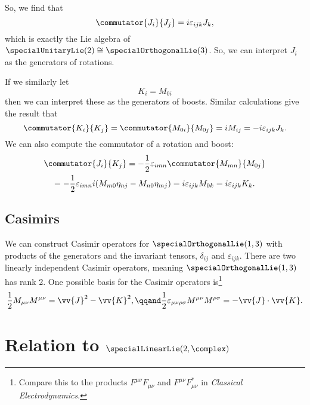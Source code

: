 \documentclass[fleqn]{NotesClass}
\newcommand{\course}[1]{\textit{#1}}
\newcommand{\minkowskiMetric}{\eta}
\newcommand{\isomorphic}{\cong}
\begin{document}
    So, we find that
    \begin{equation}
        \commutator{J_i}{J_j} = i\varepsilon_{ijk}J_k,
    \end{equation}
    which is exactly the Lie algebra of \(\specialUnitaryLie(2) \isomorphic \specialOrthogonalLie(3)\).
    So, we can interpret \(J_i\) as the generators of rotations.
    
    If we similarly let
    \begin{equation}
        K_i = M_{0i}
    \end{equation}
    then we can interpret these as the generators of boosts.
    Similar calculations give the result that
    \begin{equation}
        \commutator{K_i}{K_j} = \commutator{M_{0i}}{M_{0j}} = iM_{ij} = -i\varepsilon_{ijk}J_k.
    \end{equation}
    We can also compute the commutator of a rotation and boost:
    \begin{multline}
        \commutator{J_i}{K_j} = -\frac{1}{2}\varepsilon_{imn} \commutator{M_{mn}}{M_{0j}}\\
        = -\frac{1}{2}\varepsilon_{imn}i(M_{m0}\minkowskiMetric_{nj} - M_{n0}\minkowskiMetric_{mj}) = i\varepsilon_{ijk}M_{0k} = i\varepsilon_{ijk}K_k.
    \end{multline}
    
    \section{Casimirs}
    We can construct Casimir operators for \(\specialOrthogonalLie(1, 3)\) with products of the generators and the invariant tensors, \(\delta_{ij}\) and \(\varepsilon_{ijk}\).
    There are two linearly independent Casimir operators, meaning \(\specialOrthogonalLie(1, 3)\) has rank 2.
    One possible basis for the Casimir operators is\footnote{Compare this to the products \(F^{\mu\nu}F_{\mu\nu}\) and \(F^{\mu\nu}F^*_{\mu\nu}\) in \course{Classical Electrodynamics}.}
    \begin{equation}
        \frac{1}{2} M_{\mu\nu}M^{\mu\nu} = \vv{J}^2 - \vv{K}^2, \qqand \frac{1}{2}\varepsilon_{\mu\nu\rho\sigma} M^{\mu\nu}M^{\rho\sigma} = -\vv{J} \cdot \vv{K}.
    \end{equation}
    
    
    \chapter{Relation to \texorpdfstring{\(\specialLinearLie(2, \complex)\)}{sl(2, C)}}
\end{document}
